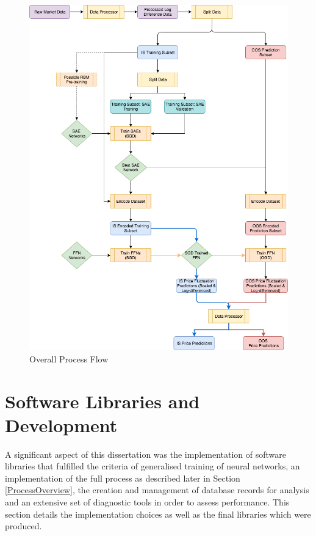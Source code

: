 \documentclass[a4paper,11pt,oneside]{article}
\theoremstyle{plain}
\theoremstyle{definition}
\begin{document}
	\begin{figure}[H]
		\centering \includegraphics[scale=0.6]{images/process_implementation/process_flow.png}
		\caption[Overall Process Flow Diagram]{Overall Process Flow}
		\label{figure-proc_diagram}
	\end{figure}
	
	
	
	
	
	
	
	
	
	
	
	
	
	
	
		\newpage
	\section{Software Libraries and Development}\label{Software}
	
	A significant aspect of this dissertation was the implementation of software libraries that fulfilled the criteria of generalised training of neural networks, an implementation of the full process as described later in Section \ref{ProcessOverview}, the creation and management of database records for analysis and an extensive set of diagnostic tools in order to assess performance. This section details the implementation choices as well as the final libraries which were produced.
	
\end{document}
